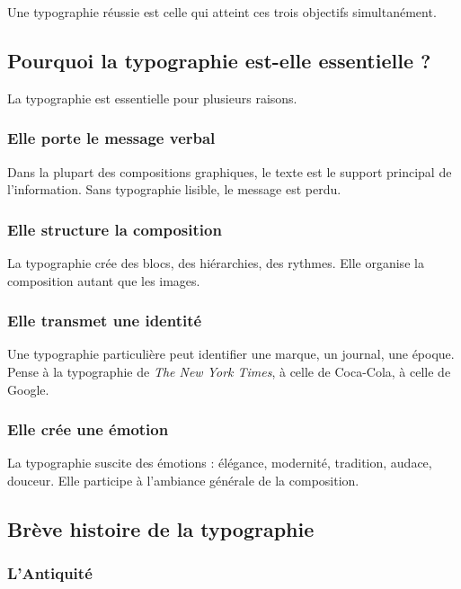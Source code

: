 Une typographie réussie est celle qui atteint ces trois objectifs simultanément.

\subsection{Pourquoi la typographie est-elle essentielle ?}

La typographie est essentielle pour plusieurs raisons.

\subsubsection{Elle porte le message verbal}

Dans la plupart des compositions graphiques, le texte est le support principal de l'information. Sans typographie lisible, le message est perdu.

\subsubsection{Elle structure la composition}

La typographie crée des blocs, des hiérarchies, des rythmes. Elle organise la composition autant que les images.

\subsubsection{Elle transmet une identité}

Une typographie particulière peut identifier une marque, un journal, une époque. Pense à la typographie de \emph{The New York Times}, à celle de Coca-Cola, à celle de Google.

\subsubsection{Elle crée une émotion}

La typographie suscite des émotions : élégance, modernité, tradition, audace, douceur. Elle participe à l'ambiance générale de la composition.

\subsection{Brève histoire de la typographie}

\subsubsection{L'Antiquité}

